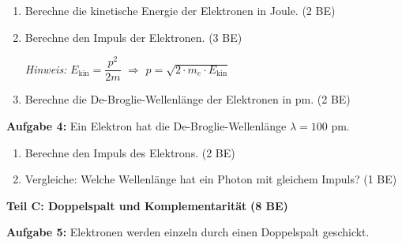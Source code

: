 \documentclass[11pt,a4paper]{article}
\begin{document}
\begin{enumerate}[label=\alph*)]
\item Berechne die kinetische Energie der Elektronen in Joule. \hfill (2 BE)

\vspace{1.5cm}

\item Berechne den Impuls der Elektronen. \hfill (3 BE)

\textit{Hinweis:} $E_{\text{kin}} = \dfrac{p^2}{2m}$ $\Rightarrow$ $p = \sqrt{2 \cdot m_e \cdot E_{\text{kin}}}$

\vspace{2cm}

\item Berechne die De-Broglie-Wellenlänge der Elektronen in pm. \hfill (2 BE)

\vspace{1.5cm}

\end{enumerate}

\textbf{Aufgabe 4:} Ein Elektron hat die De-Broglie-Wellenlänge $\lambda = 100$ pm.

\begin{enumerate}[label=\alph*), start=4]
\item Berechne den Impuls des Elektrons. \hfill (2 BE)

\vspace{1.5cm}

\item Vergleiche: Welche Wellenlänge hat ein Photon mit gleichem Impuls? \hfill (1 BE)

\vspace{1cm}

\end{enumerate}

\vspace{0.5em}


{\large\textbf{Teil C: Doppelspalt und Komplementarität}} \hfill \textbf{(8 BE)}

\vspace{0.3em}

\textbf{Aufgabe 5:} Elektronen werden einzeln durch einen Doppelspalt geschickt.
\end{document}
